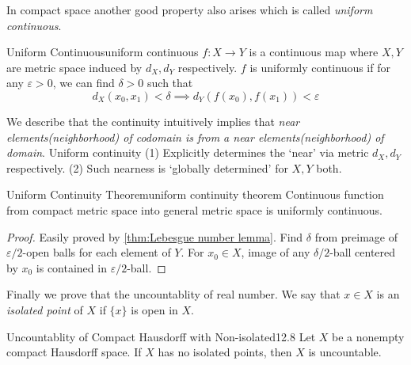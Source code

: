\documentclass[12pt, a4paper, twoside]{article}
\theoremstyle{plain}
\begin{document}
In compact space another good property also arises which is called \textit{uniform continuous}. 

\begin{defn}{Uniform Continuous}{uniform continuous}
    $f: X \rightarrow Y$ is a continuous map where $X, Y$ are metric space induced by $d_X, d_Y$ respectively. 
    $f$ is uniformly continuous if for any $\varepsilon > 0$, we can find $\delta > 0$ such that 
    \[d_X(x_0, x_1) < \delta \implies d_Y(f(x_0), f(x_1)) < \varepsilon\]
\end{defn}

We describe that the continuity intuitively implies that \textit{near elements(neighborhood) of codomain is from a near elements(neighborhood) of domain}. 
Uniform continuity (1) Explicitly determines the \lq near' via metric $d_X, d_Y$ respectively. (2) Such nearness is \lq globally determined' for $X, Y$ both. 

\begin{thm}{Uniform Continuity Theorem}{uniform continuity theorem}
    Continuous function from compact metric space into general metric space is uniformly continuous.
\end{thm}

\begin{proof}
    Easily proved by \ref{thm:Lebesgue number lemma}. Find $\delta$ from 
    preimage of $\varepsilon/2$-open balls for each element of $Y$. 
    For $x_0 \in X$, image of any $\delta/2$-ball centered by $x_0$ is contained in 
    $\varepsilon/2$-ball. 
\end{proof}

Finally we prove that the uncountablity of real number. We say that $x \in X$ is an \textit{isolated point} of $X$ 
if $\{x\}$ is open in $X$. 

\begin{thm}{Uncountablity of Compact Hausdorff with Non-isolated}{12.8}
    Let $X$ be a nonempty compact Hausdorff space. If $X$ has no isolated points, then $X$ is uncountable. 
\end{thm}
\end{document}
